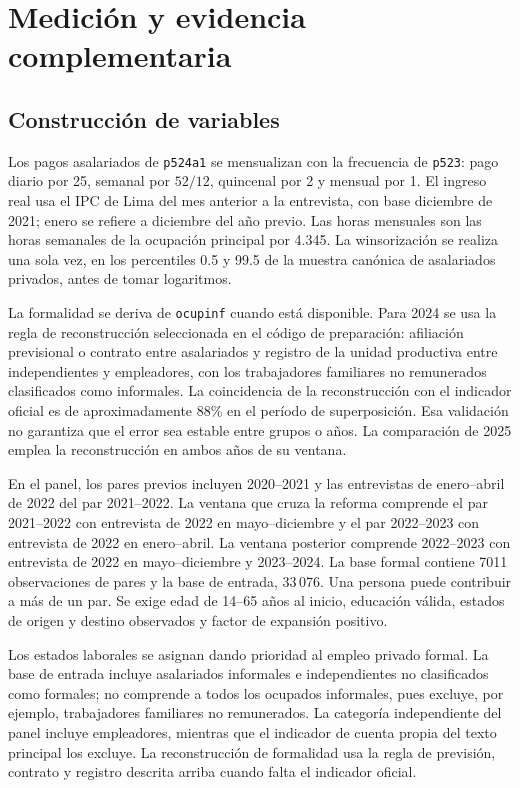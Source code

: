 \section{Medición y evidencia complementaria}
\label{app:short_measure}

\subsection{Construcción de variables}

Los pagos asalariados de \texttt{p524a1} se mensualizan con la frecuencia de \texttt{p523}: pago diario por 25, semanal por $52/12$, quincenal por 2 y mensual por 1. El ingreso real usa el IPC de Lima del mes anterior a la entrevista, con base diciembre de 2021; enero se refiere a diciembre del año previo. Las horas mensuales son las horas semanales de la ocupación principal por 4.345. La winsorización se realiza una sola vez, en los percentiles 0.5 y 99.5 de la muestra canónica de asalariados privados, antes de tomar logaritmos.

La formalidad se deriva de \texttt{ocupinf} cuando está disponible. Para 2024 se usa la regla de reconstrucción seleccionada en el código de preparación: afiliación previsional o contrato entre asalariados y registro de la unidad productiva entre independientes y empleadores, con los trabajadores familiares no remunerados clasificados como informales. La coincidencia de la reconstrucción con el indicador oficial es de aproximadamente 88\% en el período de superposición. Esa validación no garantiza que el error sea estable entre grupos o años. La comparación de 2025 emplea la reconstrucción en ambos años de su ventana.

En el panel, los pares previos incluyen 2020--2021 y las entrevistas de enero--abril de 2022 del par 2021--2022. La ventana que cruza la reforma comprende el par 2021--2022 con entrevista de 2022 en mayo--diciembre y el par 2022--2023 con entrevista de 2022 en enero--abril. La ventana posterior comprende 2022--2023 con entrevista de 2022 en mayo--diciembre y 2023--2024. La base formal contiene 7011 observaciones de pares y la base de entrada, 33\,076. Una persona puede contribuir a más de un par. Se exige edad de 14--65 años al inicio, educación válida, estados de origen y destino observados y factor de expansión positivo.

Los estados laborales se asignan dando prioridad al empleo privado formal. La base de entrada incluye asalariados informales e independientes no clasificados como formales; no comprende a todos los ocupados informales, pues excluye, por ejemplo, trabajadores familiares no remunerados. La categoría independiente del panel incluye empleadores, mientras que el indicador de cuenta propia del texto principal los excluye. La reconstrucción de formalidad usa la regla de previsión, contrato y registro descrita arriba cuando falta el indicador oficial.

